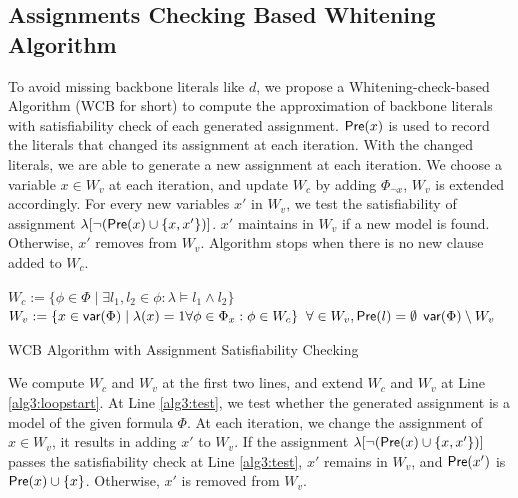 \medskip

\subsection{Assignments Checking Based Whitening Algorithm}

To avoid missing backbone literals like $d$, we propose a Whitening-check-based Algorithm (WCB for short) to compute the approximation of backbone literals with satisfiability check of each generated assignment. $\textsf{Pre}(x)$ is used to record the literals that changed its assignment at each iteration. With the changed literals, we are able to generate a new assignment at each iteration. We choose a variable $x\in W_v$ at each iteration, and update $W_c$ by adding $\Phi_{\neg x}$, $W_v$ is extended accordingly. For every new variables $x'$ in $W_v$, we test the satisfiability of assignment $\lambda[\neg (\textsf{Pre}(x)\cup\{x,x'\})]$. $x'$ maintains in $W_v$ if a new model is found. Otherwise, $x'$ removes from $W_v$. Algorithm stops when there is no new clause added to $W_c$.


\begin{algorithm2e}
\SetAlgoShortEnd
\SetFillComment
{}
$W_c:=\{\phi\in\Phi\mid \exists l_1,l_2\in\phi: \lambda\models l_1\wedge l_2\}$\;\label{alg3:l1}
$W_v:=\{x\in\textsf{var}(\Phi) \mid \lambda(x)=1 \forall\phi\in\Phi_x: \phi\in W_c\}$\; \label{alg3:l2}
$\forall \in W_v, \textsf{Pre}(l)=\emptyset$\;
\label{alg3:loopend}
\Return $\textsf{var}(\Phi)\setminus W_v$\;
\caption{WCB Algorithm with Assignment Satisfiability Checking}
\label{alg:ewhite}
\end{algorithm2e}

We compute $W_c$ and $W_v$ at the first two lines, and extend $W_c$ and $W_v$ at Line \ref{alg3:loopstart}. At Line \ref{alg3:test}, we test whether the generated assignment is a model of the given formula $\Phi$. At each iteration, we change the assignment of $x\in W_v$, it results in adding $x'$ to $W_v$. If the assignment $\lambda[\neg (\textsf{Pre}(x)\cup\{x,x'\})]$ passes the satisfiability check at Line \ref{alg3:test}, $x'$ remains in $W_v$, and $\textsf{Pre}(x')$ is $\textsf{Pre}(x)\cup \{x\}$. Otherwise, $x'$ is removed from $W_v$.


